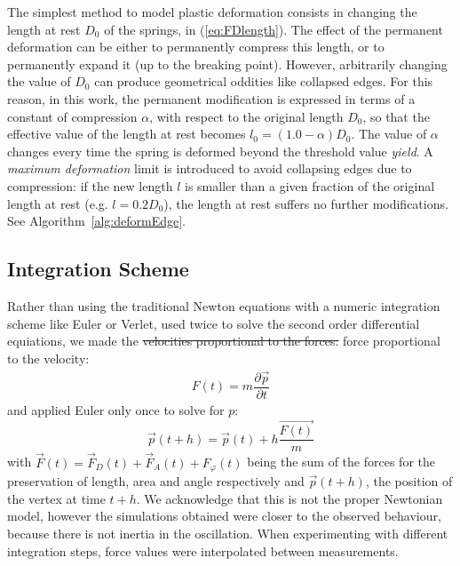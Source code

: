 \documentclass[journal]{IEEEtran}
\newcommand{\eref}[1]{(\ref{#1})}
\newcommand{\alref}[1]{Algorithm~\ref{#1}}
\newcommand{\comment}[1]{{\color{red} #1}}
\begin{document}
The simplest method to model plastic deformation consists in changing the length at rest $D_0$ of the springs, in \eref{eq:FDlength}.  The effect of the permanent deformation can be either to permanently compress this length, or to permanently expand it (up to the breaking point).  However, arbitrarily changing the value of $D_0$ can produce geometrical oddities like collapsed edges.  For this reason, in this work, the permanent modification is expressed in terms of a constant of compression $\alpha$, with respect to the original length $D_0$, so that the effective value of the length at rest becomes $l_0 = (1.0 - \alpha) D_0$.  The value of $\alpha$ changes every time the spring is deformed beyond the threshold value \textit{yield}.  A \textit{maximum deformation} limit is introduced to avoid collapsing edges due to compression: if the new length $l$ is smaller than a given fraction of the original length at rest (e.g. $l=0.2 D_0$), the length at rest suffers no further modifications.  See \alref{alg:deformEdge}.

\subsection{Integration Scheme}
\label{sec:ischeme}
Rather than using the traditional Newton equations with a numeric integration scheme like Euler \comment{or} Verlet, \comment{used twice to solve the second order differential equiations,} we made the \comment{\sout{velocities proportional to the forces:} force proportional to the velocity:
\begin{align}
 F(t) = m \dfrac{\partial \vec{p}}{\partial t}
\end{align}
and applied Euler only once to solve for $p$:
\begin{equation}
 \vec{p}(t+h) = \vec{p}(t) + h \dfrac{\vec{F(t)}}{m}\label{eq:integration}
\end{equation}}
with $\vec{F}(t) = \vec{F}_D(t) + \vec{F}_A(t) + F_\varphi(t)$ being the sum of the forces for the preservation of length, area and angle respectively and $\vec{p}(t+h)$, the position of the vertex at time $t+h$.  \comment{We acknowledge that this is not the proper Newtonian model, however t}he simulations obtained were closer to the observed behaviour, because there is not inertia in the oscillation.
When experimenting with different integration steps, force values were interpolated between measurements.
\end{document}
